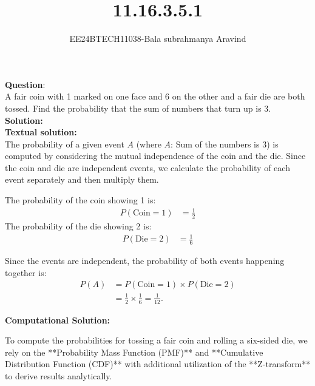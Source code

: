 \documentclass[journal]{IEEEtran}
\begin{document}

\vspace{3cm}

\title{11.16.3.5.1}
\author{EE24BTECH11038-Bala subrahmanya Aravind}
{\let\newpage\relax\maketitle}

\renewcommand{\thefigure}{\theenumi}
\renewcommand{\thetable}{\theenumi}
\setlength{\intextsep}{10pt} %

\renewcommand{\thetable}{\theenumi}

\textbf{Question}:\\ 

A fair coin with 1 marked on one face and 6 on the other and a fair die are both tossed. Find the probability that the sum of numbers that turn up is 3.\\

\textbf{Solution: }\\
\textbf{Textual solution: }\\
The probability of a given event $A$ (where $A$: Sum of the numbers is 3) is computed by considering the mutual independence of the coin and the die. Since the coin and die are independent events, we calculate the probability of each event separately and then multiply them.

The probability of the coin showing 1 is:
\begin{align}
P(\text{Coin} = 1) &= \frac{1}{2}
\end{align}
The probability of the die showing 2 is:
\begin{align}
P(\text{Die} = 2) &= \frac{1}{6}
\end{align}

Since the events are independent, the probability of both events happening together is:
\begin{align}
P(A) &= P(\text{Coin} = 1) \times P(\text{Die} = 2) \\
     &= \frac{1}{2} \times \frac{1}{6} = \frac{1}{12}.
\end{align}

\textbf{Computational Solution:}


To compute the probabilities for tossing a fair coin and rolling a six-sided die, we rely on the **Probability Mass Function (PMF)** and **Cumulative Distribution Function (CDF)** with additional utilization of the **Z-transform** to derive results analytically.
\end{document}
